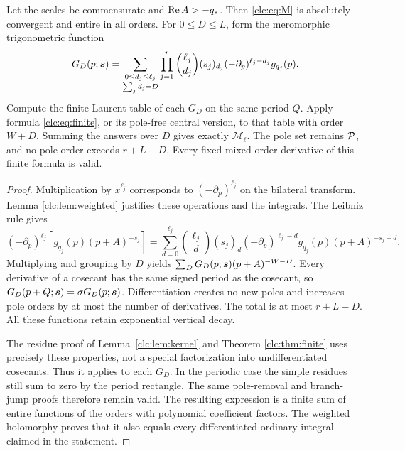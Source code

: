 \begin{theorem}
\label{clc:thm:moments}
Let the scales be commensurate and $\operatorname{Re} A>-q_*$. Then
\eqref{clc:eq:M} is absolutely convergent and entire in all orders.
For $0\le D\le L$, form the meromorphic trigonometric function
\begin{equation}\label{clc:eq:GD}
 G_D(p;\boldsymbol s)=
 \sum_{\substack{0\le d_j\le\ell_j\\\sum_jd_j=D}}
 \prod_{j=1}^r
 \binom{\ell_j}{d_j}(s_j)_{d_j}
 (-\partial_p)^{\ell_j-d_j}g_{q_j}(p).
\end{equation}
Compute the finite Laurent table of each $G_D$ on the same period $Q$.
Apply formula \eqref{clc:eq:finite}, or its pole-free central version,
to that table with order $W+D$. Summing the answers over $D$ gives
exactly $\mathcal M_{\boldsymbol\ell}$.
The pole set remains $\mathcal P$, and no pole order exceeds $r+L-D$.
Every fixed mixed order derivative of this finite formula is valid.
\end{theorem}
\begin{proof}
Multiplication by $x^{\ell_j}$ corresponds to
$(-\partial_p)^{\ell_j}$ on the bilateral transform. Lemma
\ref{clc:lem:weighted} justifies these operations and the integrals.
The Leibniz rule gives
\[
 (-\partial_p)^{\ell_j}[g_{q_j}(p)(p+A)^{-s_j}]
 =\sum_{d=0}^{\ell_j}\binom{\ell_j}{d}(s_j)_d
   (-\partial_p)^{\ell_j-d}g_{q_j}(p)(p+A)^{-s_j-d}.
\]
Multiplying and grouping by $D$ yields
$\sum_DG_D(p;\boldsymbol s)(p+A)^{-W-D}$.
Every derivative of a cosecant has the same signed period as the
cosecant, so $G_D(p+Q;\boldsymbol s)=\sigma G_D(p;\boldsymbol s)$.
Differentiation creates no new poles and increases pole orders by at
most the number of derivatives. The total is at most $r+L-D$.
All these functions retain exponential vertical decay.

The residue proof of Lemma~\ref{clc:lem:kernel} and Theorem
\ref{clc:thm:finite} uses precisely these properties, not a special
factorization into undifferentiated cosecants. Thus it applies to each
$G_D$. In the periodic case the simple residues still sum to zero by
the period rectangle. The same pole-removal and branch-jump proofs
therefore remain valid. The resulting expression is a finite sum of
entire functions of the orders with polynomial coefficient factors.
The weighted holomorphy proves that it also equals every differentiated
ordinary integral claimed in the statement.
\end{proof}

